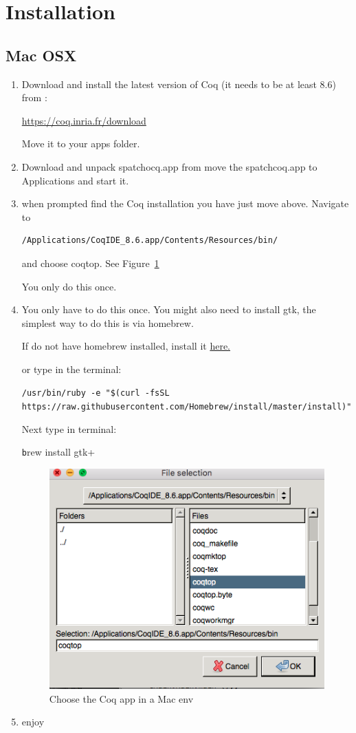 

\section{ Installation}

\subsection{Mac OSX}
\begin{enumerate}
\item Download and install  the latest version of Coq (it needs to be at least 8.6) from :

\href{https://coq.inria.fr/download}{https://coq.inria.fr/download}

Move it to your apps folder.


\item  Download and unpack spatchocq.app from 
move the spatchcoq.app to Applications and start it. 

\item when prompted find the Coq installation you have just move above. Navigate to 
\begin{verbatim}
/Applications/CoqIDE_8.6.app/Contents/Resources/bin/
\end{verbatim}
and choose coqtop. See Figure~\ref{fig:macos}

You only do this once.
\item  You only have to do this once. You might also need to install gtk, the simplest way to do this is  via homebrew.

If do not have homebrew installed,  install it
\href{https://brew.sh}{ here.}

or  type in the terminal:

{\small \texttt{/usr/bin/ruby -e "\$(curl -fsSL https://raw.githubusercontent.com/Homebrew/install/master/install)"}

Next type in terminal:

{\center \texttt brew install gtk+}}
\begin{figure}\label{fig:macos}
\center
\includegraphics[scale=0.5]{Installation/macos.png}
\caption{Choose the Coq app in a Mac env}\label{fig:macos}
\end{figure}
\item enjoy

\end{enumerate}

